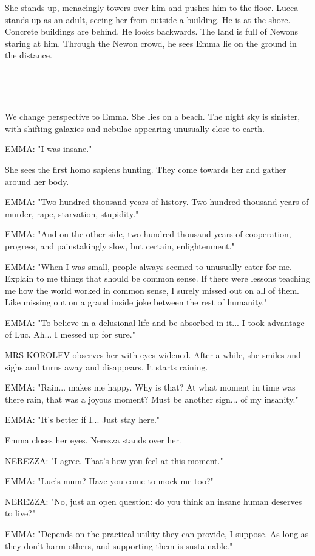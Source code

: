 \documentclass[11pt]{article}
\begin{document}
She stands up, menacingly towers over him and pushes him to the floor.
Lucca stands up as an adult, seeing her from outside a building.
He is at the shore. 
Concrete buildings are behind.
He looks backwards.
The land is full of Newons staring at him.
Through the Newon crowd, he sees Emma lie on the ground in the distance. 

\ 

\ 

We change perspective to Emma. 
She lies on a beach.
The night sky is sinister, with shifting galaxies and nebulae appearing unusually close to earth.

EMMA: "I was insane."

She sees the first homo sapiens hunting.
They come towards her and gather around her body.

EMMA: "Two hundred thousand years of history.
Two hundred thousand years of murder, rape, starvation, stupidity."

EMMA: "And on the other side, two hundred thousand years of cooperation, progress, and painstakingly slow, but certain, enlightenment."

EMMA: "When I was small, people always seemed to unusually cater for me.
Explain to me things that should be common sense.
If there were lessons teaching me how the world worked in common sense, I surely missed out on all of them.
Like missing out on a grand inside joke between the rest of humanity."

EMMA: "To believe in a delusional life and be absorbed in it...
I took advantage of Luc.
Ah... I messed up for sure."

MRS KOROLEV observes her with eyes widened.
After a while, she smiles and sighs and turns away and disappears.
It starts raining.

EMMA: "Rain... makes me happy. 
Why is that?
At what moment in time was there rain, that was a joyous moment?
Must be another sign... of my insanity."

EMMA: "It's better if I... 
Just stay here."

Emma closes her eyes.
Nerezza stands over her. 

NEREZZA: "I agree. 
That's how you feel at this moment."

EMMA: "Luc's mum? Have you come to mock me too?"

NEREZZA: "No, just an open question: do you think an insane human deserves to live?"

EMMA: "Depends on the practical utility they can provide, I suppose.
As long as they don't harm others, and supporting them is sustainable."
\end{document}

